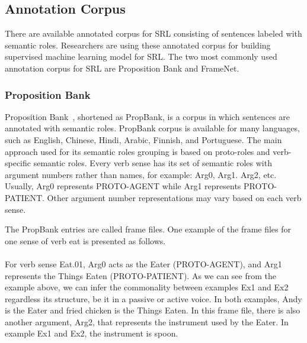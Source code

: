 \subsection{Annotation Corpus}
There are available annotated corpus for SRL consisting of sentences labeled with semantic roles. Researchers are using these annotated corpus for building supervised machine learning model for SRL. The two most commonly used annotation corpus for SRL are Proposition Bank and FrameNet.

\subsubsection{Proposition Bank}
Proposition Bank~\citep{kingsbury2002treebank}, shortened as PropBank, is a corpus in which sentences are annotated with semantic roles. PropBank corpus is available for many languages, such as English, Chinese, Hindi, Arabic, Finnish, and Portuguese. The main approach used for its semantic roles grouping is based on proto-roles and verb-specific semantic roles. Every verb sense has its set of semantic roles with argument numbers rather than names, for example: Arg0, Arg1. Arg2, etc. Usually, Arg0 represents PROTO-AGENT while Arg1 represents PROTO-PATIENT. Other argument number representations may vary based on each verb sense.

The PropBank entries are called frame files. One example of the frame files for one sense of verb eat is presented as follows.
\\
\\

For verb sense Eat.01, Arg0 acts as the Eater (PROTO-AGENT), and Arg1 represents the Things Eaten (PROTO-PATIENT). As we can see from the example above, we can infer the commonality between examples Ex1 and Ex2 regardless its structure, be it in a passive or active voice. In both examples, Andy is the Eater and fried chicken is the Things Eaten. In this frame file, there is also another argument, Arg2, that represents the instrument used by the Eater. In example Ex1 and Ex2, the instrument is spoon.

